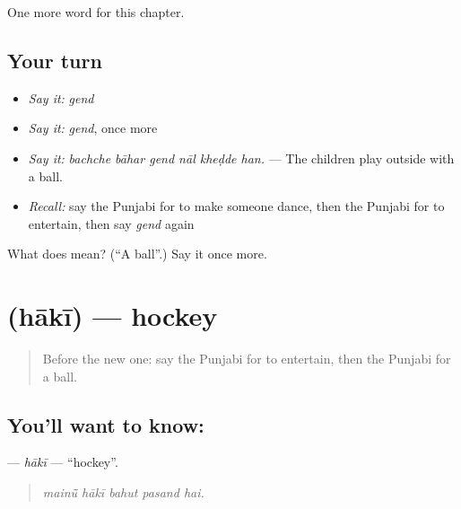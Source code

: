 \begin{grammarlens}[title={What you've built}]
One more word for this chapter.
\end{grammarlens}

\subsection*{Your turn}
\begin{itemize}
\raggedright
  \item \emph{Say it:} \emph{gend}
  \item \emph{Say it:} \emph{gend}, once more
  \item \emph{Say it:} \emph{bachche bāhar gend nāl kheḍde han.} — The children play outside with a ball.
  \item \emph{Recall:} say the Punjabi for to make someone dance, then the Punjabi for to entertain, then say \emph{gend} again
\end{itemize}

\begin{tcolorbox}[breakable,colback=teal!4,colframe=teal!35!black,title={Before you move on}]
What does  mean? (\textquotedblleft{}A ball\textquotedblright{}.) Say it once more.
\end{tcolorbox}
\section[\texorpdfstring{\pa{ਹਾਕੀ} (hākī)}{ਹਾਕੀ (hākī)}]{ (hākī) — hockey}

\label{lesson:PA-C351-haki}



\begin{quote}
Before the new one: say the Punjabi for to entertain, then the Punjabi for a ball.
\end{quote}

\subsection*{You'll want to know: }
\textbf{} — \emph{hākī} — \textquotedblleft{}hockey\textquotedblright{}.

\begin{quote}
    
\end{quote}

\begin{quote}
\emph{mainū̃ hākī bahut pasand hai.}
\end{quote}

